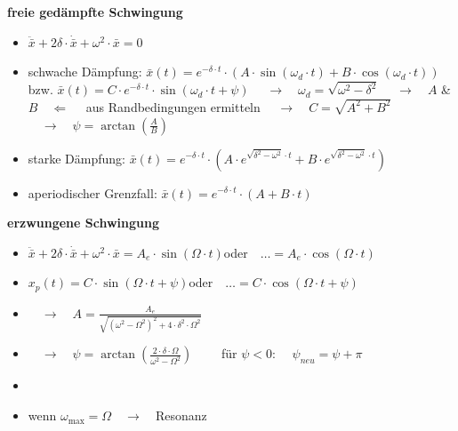 \documentclass[10pt,a4paper,landscape, hidelinks]{article}
\newcommand*\variant[1]{\bar{#1}}
\begin{document}
\begin{multicols*}{3}
\vspace{20pt}

\textbf{freie gedämpfte Schwingung}
\begin{itemize}[leftmargin=*]
        \item [] $\ddot{\variant{x}}+2\delta\cdot\dot{\variant{x}}+\omega^2\cdot\variant{x}=0$
        \item [] schwache Dämpfung: 
        \subitem $\variant{x}(t)=e^{-\delta\cdot t}\cdot\left( A\cdot\sin(\omega_d\cdot t)+B\cdot\cos(\omega_d\cdot t)\right)$
        \subitem \tabto{1.8cm}bzw.
        \subitem $\variant{x}(t)=C\cdot e^{-\delta\cdot t}\cdot\sin(\omega_d\cdot t+\psi)$
        \subitem $\quad\longrightarrow\quad\omega_d=\sqrt{\omega^2-\delta^2}$
        \subitem $\quad\longrightarrow\quad A$ \& $B\quad\Leftarrow\quad$ aus Randbedingungen ermitteln
        \subitem $\quad\longrightarrow\quad C=\sqrt{A^2+B^2}$
        \subitem $\quad\longrightarrow\quad\psi=\arctan\left(\frac{A}{B}\right)$
        \item [] starke Dämpfung: 
        \subitem $\variant{x}(t)=e^{-\delta\cdot t}\cdot\left(A\cdot e^{\sqrt{\delta^2-\omega^2}\cdot t}+B\cdot e^{\sqrt{\delta^2-\omega^2}\cdot t}\right)$
        \item [] aperiodischer Grenzfall: 
        \subitem $\variant{x}(t)=e^{-\delta\cdot t}\cdot(A+B\cdot t)$
\end{itemize}

\par\vspace{150pt}\null
\columnbreak

\textbf{erzwungene Schwingung}
\begin{itemize}[leftmargin=*]
        \item [] $\ddot{\variant{x}}+2\delta\cdot\dot{\variant{x}}+\omega^2\cdot\variant{x}=A_e\cdot\sin(\Omega\cdot t)$\tabto{5.1cm}oder$\quad\dots=A_e\cdot\cos(\Omega\cdot t)$
        \item [] $x_p(t)=C\cdot\sin(\Omega\cdot t+\psi)$\tabto{5.1cm}oder$\quad\dots=C\cdot\cos(\Omega\cdot t+\psi)$
        \item [] $\quad\longrightarrow\quad A=\frac{A_e}{\sqrt{(\omega^2-\Omega^2)^2+4\cdot\delta^2\cdot\Omega^2}}$
        \item [] $\quad\longrightarrow\quad\psi=\arctan(\frac{2\cdot\delta\cdot\Omega}{\omega^2-\Omega^2})\qquad$ für $\psi<0$: $\quad\psi_{neu}=\psi+\pi$
        \item [] 
        \item [] {\scriptsize wenn $\omega_\text{max}=\Omega\quad\rightarrow\quad$Resonanz}
\end{itemize}


\end{multicols*}
\end{document}
